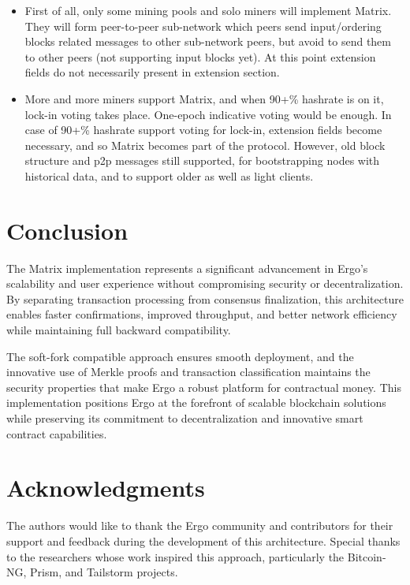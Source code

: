 \documentclass{llncs}
\newcommand{\protname}{\textsf{Matrix}}
\begin{document}
\begin{itemize}
  \item{} First of all, only some mining pools and solo miners will implement \protname{}. They will form peer-to-peer
           sub-network which peers send input/ordering blocks related messages to other sub-network peers, but avoid
           to send them to other peers (not supporting input blocks yet). At this point extension fields do not necessarily
           present in extension section.
  \item{} More and more miners support \protname{}, and when 90+\% hashrate is on it, lock-in voting takes place.
            One-epoch indicative voting would be enough. In case of 90+\% hashrate support voting for lock-in,
            extension fields become necessary, and so \protname{} becomes part of the protocol. However, old block structure
            and p2p messages still supported, for bootstrapping nodes with historical data, and to support older as well
            as light clients.
\end{itemize}


\section{Conclusion}
\label{sec:conclusion}

The \protname{} implementation represents a significant advancement in Ergo's scalability and user experience without compromising security or decentralization. By separating transaction processing from consensus finalization, this architecture enables faster confirmations, improved throughput, and better network efficiency while maintaining full backward compatibility.

The soft-fork compatible approach ensures smooth deployment, and the innovative use of Merkle proofs and transaction classification maintains the security properties that make Ergo a robust platform for contractual money. This implementation positions Ergo at the forefront of scalable blockchain solutions while preserving its commitment to decentralization and innovative smart contract capabilities.

\section*{Acknowledgments}

The authors would like to thank the Ergo community and contributors for their support and feedback during the development of this architecture. Special thanks to the researchers whose work inspired this approach, particularly the Bitcoin-NG, Prism, and Tailstorm projects.



\end{document}
